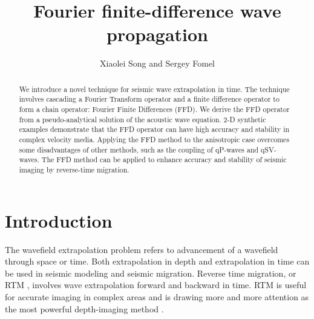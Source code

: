 \title{Fourier finite-difference wave propagation}


\author{Xiaolei Song and Sergey Fomel}



\address{Bureau of Economic Geology \\
John A. and Katherine G. Jackson School of Geosciences \\
The University of Texas at Austin \\
University Station, Box X \\
Austin, TX 78713-8924}


\maketitle

\begin{abstract}
  We introduce a novel technique for seismic wave extrapolation in
  time.  The technique involves cascading a Fourier Transform operator
  and a finite difference operator to form a chain operator: 
  Fourier Finite Differences (FFD).  We derive the FFD operator from a
  pseudo-analytical solution of the acoustic wave equation.  2-D
  synthetic examples demonstrate that the FFD operator can have high
  accuracy and stability in complex velocity media. 
  Applying the FFD method to the anisotropic case overcomes some
  disadvantages of other methods, such as the coupling of qP-waves and
  qSV-waves.  The FFD method can be applied to enhance accuracy and
  stability of seismic imaging by reverse-time migration.
\end{abstract}

\section{Introduction}

The wavefield extrapolation problem refers to advancement of a wavefield through space or time. 
Both extrapolation in depth and extrapolation in time can be used in seismic modeling and seismic migration. 
Reverse time migration, or RTM \cite[]{baysal,McMechan,whitmore,levin}, involves wave extrapolation 
forward and backward in time. RTM is useful for accurate imaging in complex areas and is drawing more and more attention as the most powerful depth-imaging method \cite[]{yoon,sym,fletcher,fowler}.\\

